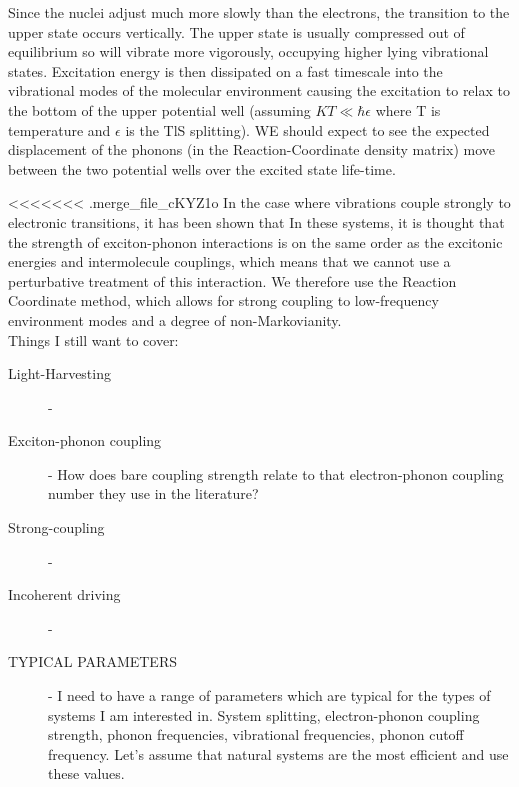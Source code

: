 \documentclass[]{article}
\begin{document}
\begin{itemize}
Since the nuclei adjust much more slowly than the electrons, the transition to the upper state occurs vertically. The upper state is usually compressed out of equilibrium so will vibrate more vigorously, occupying higher lying vibrational states. Excitation energy is then dissipated on a fast timescale into the vibrational modes of the molecular environment causing the excitation to relax to the bottom of the upper potential well (assuming $KT\ll\hbar\epsilon$ where T is temperature and $\epsilon$ is the TlS splitting). WE should expect to see the expected displacement of the phonons (in the Reaction-Coordinate density matrix) move between the two potential wells over the excited state life-time.

<<<<<<< .merge_file_cKYZ1o
In the case where vibrations couple strongly to electronic transitions, it has been shown that 
 In these systems, it is thought that the strength of exciton-phonon interactions is on the same order as the excitonic energies and intermolecule couplings, which means that we cannot use a perturbative treatment of this interaction. We therefore use the Reaction Coordinate method, which allows for strong coupling to low-frequency environment modes and a degree of non-Markovianity. 
\\ 


Things I still want to cover:
\begin{description}
	\item[Light-Harvesting] - 
	\item[Exciton-phonon coupling] - How does bare coupling strength relate to that electron-phonon coupling number they use in the literature?
	\item[Strong-coupling] - 
	\item[Incoherent driving] - 
	\item[TYPICAL PARAMETERS] - I need to have a range of parameters which are typical for the types of systems I am interested in. System splitting, electron-phonon coupling strength, phonon frequencies, vibrational frequencies, phonon cutoff frequency. Let's assume that natural systems are the most efficient and use these values.
\end{description}

\end{itemize}
\end{document}

